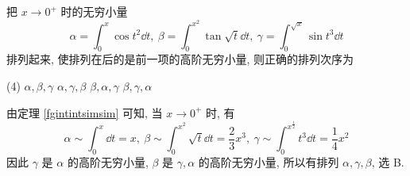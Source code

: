 \begin{example}
    把 $x\to0^+$ 时的无穷小量 $$\alpha=\int_{0}^{x}\cos t^2\dd t,~\beta=\int_{0}^{x^2}\tan\sqrt{t}\dd t,~\gamma=\int_{0}^{\sqrt{x}}\sin t^3\dd t$$
    排列起来, 使排列在后的是前一项的高阶无穷小量, 则正确的排列次序为
    \begin{tasks}(4)
        \task $\alpha,\beta,\gamma$
        \task $\alpha,\gamma,\beta$
        \task $\beta,\alpha,\gamma$
        \task $\beta,\gamma,\alpha$
    \end{tasks}
\end{example}
\begin{solution}
    由定理 \ref{fgintintsimsim} 可知, 当 $x\to0^+$ 时, 有
    $$\alpha\sim\int_{0}^{x}\dd t=x,~\beta \sim\int_{0}^{x^2}\sqrt{t}\dd t=\dfrac{2}{3}x^3,~\gamma\sim\int_{0}^{x^{\frac{1}{2}}}t^3\dd t=\dfrac{1}{4}x^2$$
    因此 $\gamma$ 是 $\alpha$ 的高阶无穷小量, $\beta $ 是 $\gamma,\alpha$ 的高阶无穷小量, 所以有排列 $\alpha,\gamma,\beta$, 选 B.
\end{solution}

